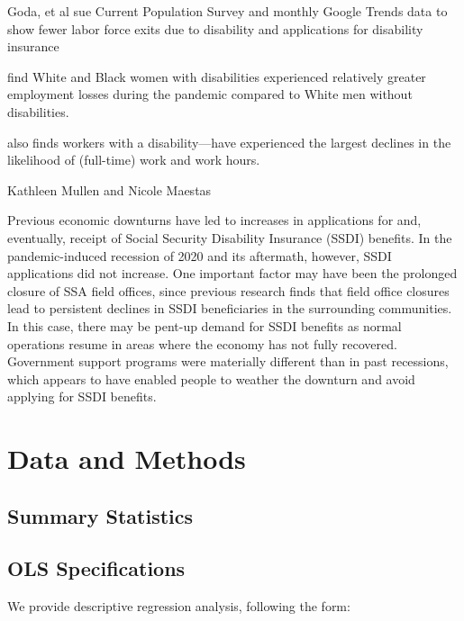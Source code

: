 \documentclass[12pt]{article}
\begin{document}
  Goda, et al sue Current Population Survey and monthly Google Trends data to show fewer labor force exits due to disability and applications for disability insurance \citep{goda2022impact}





\citeauthor{schur2021covid} find White and Black women with disabilities experienced relatively greater employment losses during the pandemic compared to White men without disabilities. \citep{schur2021covid}

   \cite{cowan2020short} also finds workers with a disability—have experienced the largest declines in the likelihood of (full-time) work and work hours.

 

  
 
Kathleen Mullen and Nicole Maestas
 
Previous economic downturns have led to increases in applications for and, eventually, receipt of Social Security Disability Insurance (SSDI) benefits. In the pandemic-induced recession of 2020 and its aftermath, however, SSDI applications did not increase. One important factor may have been the prolonged closure of SSA field offices, since previous research finds that field office closures lead to persistent declines in SSDI beneficiaries in the surrounding communities. In this case, there may be pent-up demand for SSDI benefits as normal operations resume in areas where the economy has not fully recovered. Government support programs were materially different than in past recessions, which appears to have enabled people to weather the downturn and avoid applying for SSDI benefits. \cite{mullen2022economic}

 


 
 
\section{Data and Methods}


\subsection{Summary Statistics}


\subsection{OLS Specifications}
We provide descriptive regression analysis, following the form:
\end{document}
